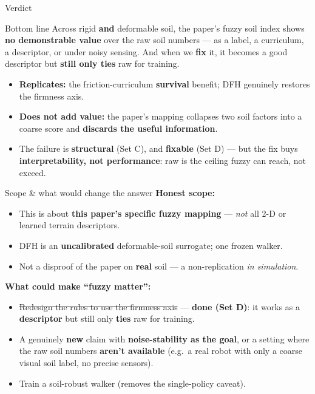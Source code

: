 \documentclass[aspectratio=169]{beamer}
\newcommand{\good}[1]{\textcolor{green!55!black}{\textbf{#1}}}
\newcommand{\bad}[1]{\textcolor{red!70!black}{\textbf{#1}}}
\begin{document}
\begin{frame}{Verdict}
  \begin{block}{Bottom line}
    Across rigid \textbf{and} deformable soil, the paper's fuzzy soil index shows
    \textbf{no demonstrable value} over the raw soil numbers — as a label, a curriculum,
    a descriptor, or under noisy sensing. And when we \textbf{fix} it, it becomes a good
    descriptor but \textbf{still only ties} raw for training.
  \end{block}
  \begin{itemize}
    \item \good{Replicates:} the friction-curriculum \textbf{survival} benefit; DFH genuinely
          restores the firmness axis.
    \item \bad{Does not add value:} the paper's mapping collapses two soil factors into a coarse
          score and \textbf{discards the useful information}.
    \item The failure is \textbf{structural} (Set C), and \textbf{fixable} (Set D) — but the fix
          buys \textbf{interpretability, not performance}: raw is the ceiling fuzzy can reach,
          not exceed.
  \end{itemize}
\end{frame}

\begin{frame}{Scope \& what would change the answer}
  \textbf{Honest scope:}
  \begin{itemize}
    \item This is about \textbf{this paper's specific fuzzy mapping} — \textit{not} all 2-D or
          learned terrain descriptors.
    \item DFH is an \textbf{uncalibrated} deformable-soil surrogate; one frozen walker.
    \item Not a disproof of the paper on \textbf{real} soil — a non-replication \textit{in simulation}.
  \end{itemize}
  \textbf{What could make ``fuzzy matter'':}
  \begin{itemize}
    \item \sout{Redesign the rules to use the firmness axis} — \good{done (Set D)}: it works as a
          \textbf{descriptor} but still only \textbf{ties} raw for training.
    \item A genuinely \textbf{new} claim with \textbf{noise-stability as the goal}, or a setting
          where the raw soil numbers \textbf{aren't available} (e.g.\ a real robot with only a
          coarse visual soil label, no precise sensors).
    \item Train a soil-robust walker (removes the single-policy caveat).
  \end{itemize}
\end{frame}
\end{document}
